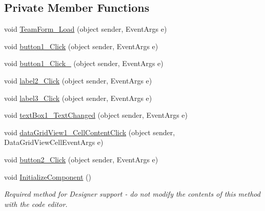 \subsection*{Private Member Functions}
\begin{DoxyCompactItemize}
\item 
void \hyperlink{classPCO_1_1__0_1_1TeamForm_a899e959028d070cd6b8f5f66fa02dd39}{Team\+Form\+\_\+\+Load} (object sender, Event\+Args e)
\item 
void \hyperlink{classPCO_1_1__0_1_1TeamForm_add11c999c9095c4ef00332838caba21f}{button1\+\_\+\+Click} (object sender, Event\+Args e)
\item 
void \hyperlink{classPCO_1_1__0_1_1TeamForm_aeec31c575e52aa85997d15790bf8247b}{button1\+\_\+\+Click\+\_} (object sender, Event\+Args e)
\item 
void \hyperlink{classPCO_1_1__0_1_1TeamForm_a22becf6adc591129aab673894df17e50}{label2\+\_\+\+Click} (object sender, Event\+Args e)
\item 
void \hyperlink{classPCO_1_1__0_1_1TeamForm_affe7a93b62d0e51f0bd8ad1cd0e36fe3}{label3\+\_\+\+Click} (object sender, Event\+Args e)
\item 
void \hyperlink{classPCO_1_1__0_1_1TeamForm_a6601c5199799335b1b2056a9ab9ad53c}{text\+Box1\+\_\+\+Text\+Changed} (object sender, Event\+Args e)
\item 
void \hyperlink{classPCO_1_1__0_1_1TeamForm_acfb27ec80635fa1a5bc8c5a7c017e7d8}{data\+Grid\+View1\+\_\+\+Cell\+Content\+Click} (object sender, Data\+Grid\+View\+Cell\+Event\+Args e)
\item 
void \hyperlink{classPCO_1_1__0_1_1TeamForm_ac7fa1fa02781cfe64bdb28ee3f47b35b}{button2\+\_\+\+Click} (object sender, Event\+Args e)
\item 
void \hyperlink{classPCO_1_1__0_1_1TeamForm_a2f95204581542deb466d2c1643aea9d3}{Initialize\+Component} ()
\begin{DoxyCompactList}\small\item\em Required method for Designer support -\/ do not modify the contents of this method with the code editor. \end{DoxyCompactList}\end{DoxyCompactItemize}
